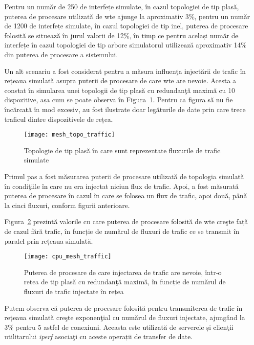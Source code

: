 Pentru un număr de 250 de interfețe simulate, în cazul topologiei de tip plasă, puterea de procesare utilizată de \gls{wte} ajunge la aproximativ 3\%, pentru un număr de 1200 de interfețe simulate, în cazul topologiei de tip inel, puterea de procesare folosită se situează în jurul valorii de 12\%, în timp ce pentru același număr de interfețe în cazul topologiei de tip arbore simulatorul utilizează aproximativ 14\% din puterea de procesare a sistemului.

Un alt scenariu a fost considerat pentru a măsura influenţa injectării de trafic în rețeaua simulată asupra puterii de procesare de care \gls{wte} are nevoie. Acesta a constat în simularea unei topologii de tip plasă cu redundanţă maximă cu 10 dispozitive, așa cum se poate observa în Figura~\ref{fig:mesh_topo_traffic}. Pentru ca figura să nu fie încărcată în mod excesiv, au fost ilustrate doar legăturile de date prin care trece traficul dintre dispozitivele de rețea.

\begin{figure}[hp]
	\centering
	\texttt{[image: mesh\_topo\_traffic]}
	\caption{Topologie de tip plasă în care sunt reprezentate fluxurile de trafic simulate}
	\label{fig:mesh_topo_traffic}
\end{figure}

Primul pas a fost măsurarea puterii de procesare utilizată de topologia simulată în condiţiile în care nu era injectat niciun flux de trafic. Apoi, a fost măsurată puterea de procesare în cazul în care se folosea un flux de trafic, apoi două, până la cinci fluxuri, conform figurii anterioare.

Figura~\ref{fig:cpu_mesh_traffic} prezintă valorile cu care puterea de procesare folosită de \gls{wte} creşte față de cazul fără trafic, în funcție de numărul de fluxuri de trafic ce se transmit în paralel prin rețeaua simulată.

\begin{figure}[hp]
	\centering
	\texttt{[image: cpu\_mesh\_traffic]}
	\caption{Puterea de procesare de care injectarea de trafic are nevoie, într-o rețea de tip plasă cu redundanţă maximă, în funcție de numărul de fluxuri de trafic injectate în rețea}
	\label{fig:cpu_mesh_traffic}
\end{figure}

Putem observa că puterea de procesare folosită pentru transmiterea de trafic în rețeaua simulată creşte exponenţial cu numărul de fluxuri injectate, ajungând la 3\% pentru 5 astfel de conexiuni. Aceasta este utilizată de serverele și clienţii utilitarului \textit{iperf} asociaţi cu aceste operații de transfer de date.

